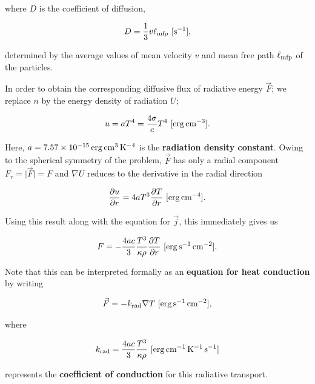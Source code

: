 \documentclass[a4paper,10pt]{article}
\begin{document}
{\noindent}where $D$ is the coefficient of diffusion,

\begin{align*}
    D = \frac{1}{3}v\ell_{\rm mfp} ~ [{\rm s^{-1}}],
\end{align*}

{\noindent}determined by the average values of mean velocity $v$ and mean free path $\ell_{\rm mfp}$ of the particles.

{\noindent}In order to obtain the corresponding diffusive flux of radiative energy $\vec{F}$; we replace $n$ by the energy density of radiation $U$;

\begin{align*}
    u = aT^4 = \frac{4\sigma}{c}T^4 ~ [{\rm erg\,cm^{-3}}].
\end{align*}

{\noindent}Here, $a=7.57\times10^{-15}\,{\rm erg\,cm^{3}\,K^{-4}}$ is the \textbf{radiation density constant}. Owing to the spherical symmetry of the problem, $\vec{F}$ has only a radial component $F_r=\lvert\vec{F}\rvert=F$ and $\nabla U$ reduces to the derivative in the radial direction

\begin{align*}
    \frac{\partial u}{\partial r} = 4aT^3\frac{\partial T}{\partial r} ~ [{\rm erg\,cm^{-4}}].
\end{align*}

{\noindent}Using this result along with the equation for $\vec{j}$, this immediately gives us

\begin{align*}
    F = - \frac{4ac}{3} \frac{T^3}{\kappa\rho} \frac{\partial T}{\partial r} ~ [{\rm erg\,s^{-1}\,cm^{-2}}].
\end{align*}

{\noindent}Note that this can be interpreted formally as an \textbf{equation for heat conduction} by writing

\begin{align*}
    \vec{F} = -k_{\rm rad}\nabla T ~ [{\rm erg\,s^{-1}\,cm^{-2}}],
\end{align*}

{\noindent}where 

\begin{align*}
    k_{\rm rad} = \frac{4ac}{3} \frac{T^3}{\kappa\rho} ~ [{\rm erg\,cm^{-1}\,K^{-1}\,s^{-1}}]
\end{align*}

{\noindent}represents the \textbf{coefficient of conduction} for this radiative transport.
\end{document}
